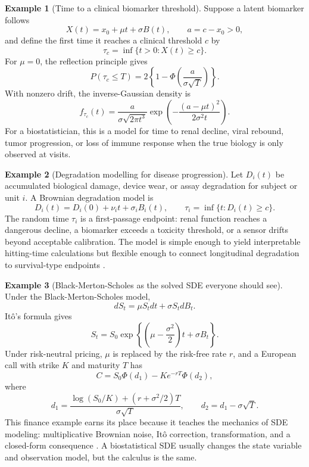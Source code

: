 \documentclass{article}
\theoremstyle{plain}
\theoremstyle{definition}
\newtheorem{example}{Example}
\begin{document}
\begin{example}[Time to a clinical biomarker threshold]
Suppose a latent biomarker follows
\[
X(t)=x_0+\mu t+\sigma B(t),\qquad a=c-x_0>0,
\]
and define the first time it reaches a clinical threshold \(c\) by
\[
\tau_c=\inf\{t>0:X(t)\ge c\}.
\]
For \(\mu=0\), the reflection principle gives
\[
P(\tau_c\le T)=2\left\{1-\Phi\left(\frac{a}{\sigma\sqrt{T}}\right)\right\}.
\]
With nonzero drift, the inverse-Gaussian density is
\[
f_{\tau_c}(t)=\frac{a}{\sigma\sqrt{2\pi t^3}}
\exp\left(-\frac{(a-\mu t)^2}{2\sigma^2t}\right).
\]
For a biostatistician, this is a model for time to renal decline, viral rebound, tumor progression, or loss of immune response when the true biology is only observed at visits.
\end{example}

\begin{example}[Degradation modelling for disease progression]
Let \(D_i(t)\) be accumulated biological damage, device wear, or assay degradation for subject or unit \(i\). A Brownian degradation model is
\[
D_i(t)=D_i(0)+\nu_i t+\sigma_iB_i(t),
\qquad
\tau_i=\inf\{t:D_i(t)\ge c\}.
\]
The random time \(\tau_i\) is a first-passage endpoint: renal function reaches a dangerous decline, a biomarker exceeds a toxicity threshold, or a sensor drifts beyond acceptable calibration. The model is simple enough to yield interpretable hitting-time calculations but flexible enough to connect longitudinal degradation to survival-type endpoints \citep{kahle2016degradation}.
\end{example}

\begin{example}[Black-Merton-Scholes as the solved SDE everyone should see]
Under the Black-Merton-Scholes model,
\[
dS_t=\mu S_tdt+\sigma S_tdB_t.
\]
Itô's formula gives
\[
S_t=S_0\exp\left\{\left(\mu-\frac{\sigma^2}{2}\right)t+\sigma B_t\right\}.
\]
Under risk-neutral pricing, \(\mu\) is replaced by the risk-free rate \(r\), and a European call with strike \(K\) and maturity \(T\) has
\[
C=S_0\Phi(d_1)-Ke^{-rT}\Phi(d_2),
\]
where
\[
d_1=\frac{\log(S_0/K)+(r+\sigma^2/2)T}{\sigma\sqrt T},
\qquad
d_2=d_1-\sigma\sqrt T.
\]
This finance example earns its place because it teaches the mechanics of SDE modeling: multiplicative Brownian noise, Itô correction, transformation, and a closed-form consequence \citep{black1973pricing,merton1973theory}. A biostatistical SDE usually changes the state variable and observation model, but the calculus is the same.
\end{example}
\end{document}
